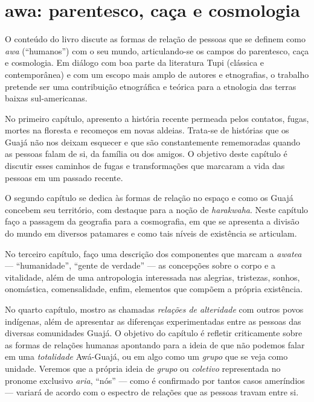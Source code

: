 \section{awa: parentesco, caça e cosmologia}

O conteúdo do livro discute as formas de relação de pessoas que se
definem como \textit{awa} (``humanos'') com o seu mundo, articulando-se os
campos do parentesco, caça e cosmologia. Em diálogo com boa parte da
literatura Tupi (clássica e contemporânea) e com um escopo mais amplo de
autores e etnografias, o trabalho pretende ser uma contribuição
etnográfica e teórica para a etnologia das terras baixas sul-americanas.


No primeiro capítulo, apresento a história recente permeada pelos
contatos, fugas, mortes na floresta e recomeços em novas aldeias.
Trata-se de histórias que os Guajá não nos deixam esquecer e que são
constantemente rememoradas quando as pessoas falam de si, da família ou
dos amigos. O objetivo deste capítulo é discutir esses caminhos de fugas
e transformações que marcaram a vida das pessoas em um passado recente.

O segundo capítulo se dedica às formas de relação no espaço e como os
Guajá concebem seu território, com destaque para a noção de
\textit{harakwaha}. Neste capítulo faço a passagem da geografia para a
cosmografia, em que se apresenta a divisão do mundo em diversos
patamares e como tais níveis de existência se articulam.

No terceiro capítulo, faço uma descrição dos componentes que marcam a
\textit{awatea} --- ``humanidade'', ``gente de verdade'' --- as concepções sobre
o corpo e a vitalidade, além de uma antropologia interessada nas
alegrias, tristezas, sonhos, onomástica, comensalidade, enfim, elementos
que compõem a própria existência.

No quarto capítulo, mostro as chamadas \textit{relações de alteridade}
com outros povos indígenas, além de apresentar as diferenças
experimentadas entre as pessoas das diversas comunidades Guajá. O
objetivo do capítulo é refletir criticamente sobre as formas de relações
humanas apontando para a ideia de que não podemos falar em uma
\textit{totalidade} Awá-Guajá, ou em algo como um \textit{grupo} que se veja
como unidade. Veremos que a própria ideia de \textit{grupo} ou
\textit{coletivo} representada no pronome exclusivo \textit{aria}, ``nós'' ---
como é confirmado por tantos casos ameríndios --- variará de acordo com o
espectro de relações que as pessoas travam entre si.


